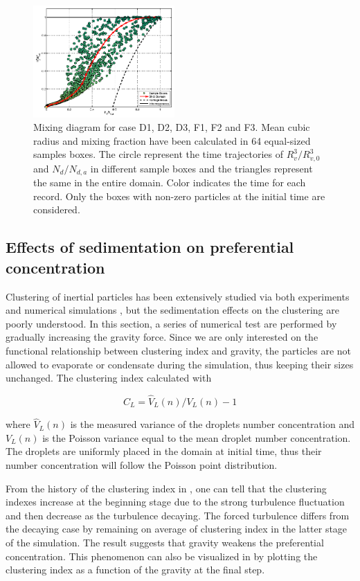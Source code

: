 \begin{figure}
\includegraphics[width=0.48\textwidth]{Figures/mixing_casef3}
\caption{Mixing diagram for case D1, D2, D3, F1, F2 and F3. Mean cubic radius
and mixing fraction have been calculated in 64 equal-sized samples boxes. The
circle represent the time trajectories of $R_v^3/R_{v,0}^3$ and $N_d/N_{d,a}$
in different sample boxes and the triangles represent the same in the entire
domain. Color indicates the time for each record. Only the boxes with non-zero
particles at the initial time are considered. \label{fig:mixing_diagram}}
\end{figure}

\subsection{Effects of sedimentation on preferential concentration}
Clustering of inertial particles has been extensively studied via both
experiments and numerical simulations \cite{Sundaram97, Reade2000}, but the
sedimentation effects on the clustering are poorly understood. In this section,
a series of numerical test are performed by gradually increasing the gravity
force. Since we are only interested on the functional relationship between
clustering index and gravity, the particles are not allowed to evaporate or
condensate during the simulation, thus keeping their sizes unchanged.  The
clustering index calculated with \cite{Vaillancourt02}

\begin{equation}
C_L = \hat{V}_L(n)/V_L(n)-1
\label{eq:cluster_index}
\end{equation}

where $\hat{V}_L(n)$ is the measured variance of the droplets number
concentration and $V_L(n)$ is the Poisson variance equal to the mean droplet
number concentration. The droplets are uniformly placed in the domain at
initial time, thus their number concentration will follow the Poisson point
distribution.

From the history of the clustering index in , one can
tell that the clustering indexes increase at the beginning stage due to the
strong turbulence fluctuation and then decrease as the turbulence decaying. The
forced turbulence differs from the decaying case by remaining on average of
clustering index in the latter stage of the simulation. The result suggests
that gravity weakens the preferential concentration. This phenomenon can also
be visualized in  by plotting the clustering index as a
function of the gravity at the final step.

